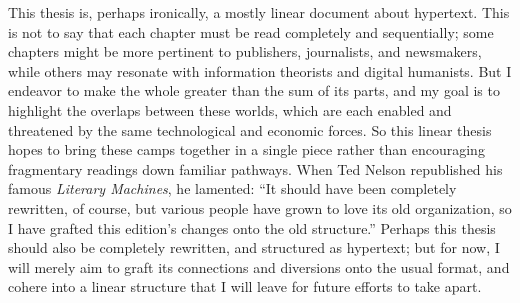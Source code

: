 
This thesis is, perhaps ironically, a mostly linear document about hypertext. This is not to say that each chapter must be read completely and sequentially; some chapters might be more pertinent to publishers, journalists, and newsmakers, while others may resonate with information theorists and digital humanists. But I endeavor to make the whole greater than the sum of its parts, and my goal is to highlight the overlaps between these worlds, which are each enabled and threatened by the same technological and economic forces. So this linear thesis hopes to bring these camps together in a single piece rather than encouraging fragmentary readings down familiar pathways. When Ted Nelson republished his famous \emph{Literary Machines}, he lamented: ``It should have been completely rewritten, of course, but various people have grown to love its old organization, so I have grafted this edition's changes onto the old structure.'' Perhaps this thesis should also be completely rewritten, and structured as hypertext; but for now, I will merely aim to graft its connections and diversions onto the usual format, and cohere into a linear structure that I will leave for future efforts to take apart.





